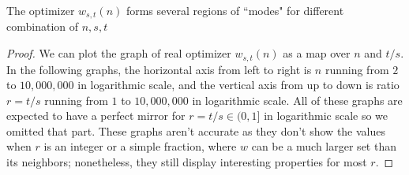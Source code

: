\documentclass[]{article}
\begin{document}
\vspace{1cm}
\begin{lemma} [Modes]
	The optimizer $w_{s,t}(n)$ forms several regions of ``modes" for different combination of ${n,s,t}$
\end{lemma}
\begin{proof}
	We can plot the graph of real optimizer $w_{s,t}(n)$ as a map over $n$ and $t/s$. In the following graphs, the horizontal axis from left to right is $n$ running from $2$ to $10,000,000$ in logarithmic scale, and the vertical axis from up to down is ratio $r= t/s$ running from $1$ to $10,000,000$ in logarithmic scale.  All of these graphs are expected to have a perfect mirror for $r= t/s \in (0, 1]$ in logarithmic scale so we omitted that part. These graphs aren't accurate as they don't show the values when $r$ is an integer or a simple fraction, where $w$ can be a much larger set than its neighbors; nonetheless, they still display interesting properties for most $r$.


\end{proof}
\end{document}
